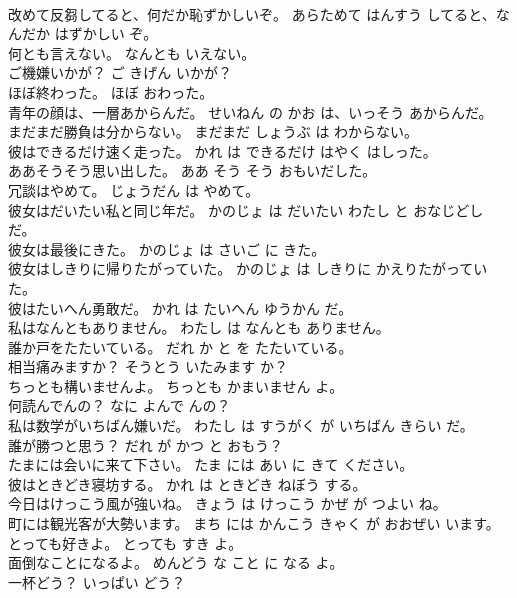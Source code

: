 \documentclass[8pt]{extreport}
\begin{document}
\begin{CJK}{UTF8}{min}
\\	改めて反芻してると、何だか恥ずかしいぞ。	あらためて はんすう してると、なんだか はずかしい ぞ。	
\\	何とも言えない。	なんとも いえない。	
\\	ご機嫌いかが？	ご きげん いかが？	
\\	ほぼ終わった。	ほぼ おわった。	
\\	青年の顔は、一層あからんだ。	せいねん の かお は、いっそう あからんだ。	
\\	まだまだ勝負は分からない。	まだまだ しょうぶ は わからない。	
\\	彼はできるだけ速く走った。	かれ は できるだけ はやく はしった。	
\\	ああそうそう思い出した。	ああ そう そう おもいだした。	
\\	冗談はやめて。	じょうだん は やめて。	
\\	彼女はだいたい私と同じ年だ。	かのじょ は だいたい わたし と おなじどし だ。	
\\	彼女は最後にきた。	かのじょ は さいご に きた。	
\\	彼女はしきりに帰りたがっていた。	かのじょ は しきりに かえりたがっていた。	
\\	彼はたいへん勇敢だ。	かれ は たいへん ゆうかん だ。	
\\	私はなんともありません。	わたし は なんとも ありません。	
\\	誰か戸をたたいている。	だれ か と を たたいている。	
\\	相当痛みますか？	そうとう いたみます か？	
\\	ちっとも構いませんよ。	ちっとも かまいません よ。	
\\	何読んでんの？	なに よんで んの？	
\\	私は数学がいちばん嫌いだ。	わたし は すうがく が いちばん きらい だ。	
\\	誰が勝つと思う？	だれ が かつ と おもう？	
\\	たまには会いに来て下さい。	たま には あい に きて ください。	
\\	彼はときどき寝坊する。	かれ は ときどき ねぼう する。	
\\	今日はけっこう風が強いね。	きょう は けっこう かぜ が つよい ね。	
\\	町には観光客が大勢います。	まち には かんこう きゃく が おおぜい います。	
\\	とっても好きよ。	とっても すき よ。	
\\	面倒なことになるよ。	めんどう な こと に なる よ。	
\\	一杯どう？	いっぱい どう？	

\end{CJK}
\end{document}
